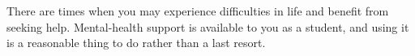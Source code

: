 There are times when you may experience difficulties in life and benefit from
seeking help. Mental-health support is available to you as a student, and using
it is a reasonable thing to do rather than a last resort.
